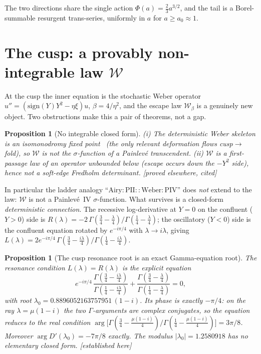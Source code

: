 \documentclass[11pt,reqno]{amsart}
\theoremstyle{plain}
\newtheorem{proposition}[theorem]{Proposition}
\theoremstyle{definition}
\theoremstyle{remark}
\newcommand{\W}{\mathcal{W}}
\newcommand{\tagPr}{{\footnotesize\textsf{[established here]}}}
\newcommand{\tagP}{{\footnotesize\textsf{[proved elsewhere, cited]}}}
\begin{document}
The two directions share the single action $\Phi(a)=\tfrac23a^{3/2}$, and the tail is a
Borel-summable resurgent trans-series, uniformly in $a$ for $a\ge a_0\approx1$.

\section{The cusp: a provably non-integrable law $\W$}\label{sec:cusp}

At the cusp the inner equation is the stochastic Weber operator
$u''=(\mathrm{sign}(Y)Y^2-\eta\xi)u$, $\beta=4/\eta^2$, and the escape law $\W_\beta$ is a genuinely
new object. Two obstructions make this a pair of theorems, not a gap.

\begin{proposition}[No integrable closed form]\label{prop:noint}
\emph{(i)} The deterministic Weber skeleton is an isomonodromy fixed point~\cite{JMU1981} (the only
relevant deformation flows cusp$\to$fold), so $\W$ is not the $\sigma$-function of a Painlev\'e
transcendent.
\emph{(ii)} $\W$ is a first-passage law of an operator unbounded below (escape occurs down the
$-Y^2$ side), hence not a soft-edge Fredholm determinant. \tagP
\end{proposition}

In particular the ladder analogy ``$\mathrm{Airy}{:}\mathrm{PII}::\mathrm{Weber}{:}\mathrm{PIV}$''
does \emph{not} extend to the law: $\W$ is not a Painlev\'e~IV $\sigma$-function. What survives is a
closed-form \emph{deterministic connection}. The recessive log-derivative at $Y=0$ on the confluent
($Y>0$) side is $R(\lambda)=-2\,\Gamma(\tfrac34-\tfrac\lambda4)/\Gamma(\tfrac14-\tfrac\lambda4)$; the
oscillatory ($Y<0$) side is the confluent equation rotated by $e^{-i\pi/4}$ with $\lambda\to i\lambda$,
giving $L(\lambda)=2e^{-i\pi/4}\,\Gamma(\tfrac34-\tfrac{i\lambda}4)/\Gamma(\tfrac14-\tfrac{i\lambda}4)$.

\begin{proposition}[The cusp resonance root is an exact Gamma-equation root]\label{prop:lz}
The resonance condition $L(\lambda)=R(\lambda)$ is the explicit equation
\[
e^{-i\pi/4}\,\frac{\Gamma(\tfrac34-\tfrac{i\lambda}4)}{\Gamma(\tfrac14-\tfrac{i\lambda}4)}
+\frac{\Gamma(\tfrac34-\tfrac\lambda4)}{\Gamma(\tfrac14-\tfrac\lambda4)}=0,
\]
with root $\lambda_0=0.8896052163757951\,(1-i)$. Its phase is \emph{exactly} $-\pi/4$: on the ray
$\lambda=\mu(1-i)$ the two $\Gamma$-arguments are complex conjugates, so the equation reduces to the
real condition $\arg\bigl[\Gamma(\tfrac34-\tfrac{\mu(1-i)}4)/\Gamma(\tfrac14-\tfrac{\mu(1-i)}4)\bigr]
=3\pi/8$. Moreover $\arg D'(\lambda_0)=-7\pi/8$ exactly. The modulus $|\lambda_0|=1.2580918$ has no
elementary closed form. \tagPr
\end{proposition}
\end{document}
